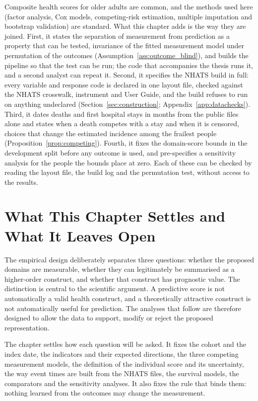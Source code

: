 Composite health scores for older adults are common, and the methods used here (factor analysis, Cox models, competing-risk estimation, multiple imputation and bootstrap validation) are standard. What this chapter adds is the way they are joined. First, it states the separation of measurement from prediction as a property that can be tested, invariance of the fitted measurement model under permutation of the outcomes (Assumption~\ref{ass:outcome_blind}), and builds the pipeline so that the test can be run; the code that accompanies the thesis runs it, and a second analyst can repeat it. Second, it specifies the NHATS build in full: every variable and response code is declared in one layout file, checked against the NHATS crosswalk, instrument and User Guide, and the build refuses to run on anything undeclared (Section~\ref{sec:construction}; Appendix~\ref{app:datachecks}). Third, it dates deaths and first hospital stays in months from the public files alone and states when a death competes with a stay and when it is censored, choices that change the estimated incidence among the frailest people (Proposition~\ref{prop:competing}). Fourth, it fixes the domain-score bounds in the development split before any outcome is used, and pre-specifies a sensitivity analysis for the people the bounds place at zero. Each of these can be checked by reading the layout file, the build log and the permutation test, without access to the results.

\section{What This Chapter Settles and What It Leaves Open}
\label{sec:methods-close}

The empirical design deliberately separates three questions: whether the proposed domains are measurable, whether they can legitimately be summarised as a higher-order construct, and whether that construct has prognostic value. The distinction is central to the scientific argument. A predictive score is not automatically a valid health construct, and a theoretically attractive construct is not automatically useful for prediction. The analyses that follow are therefore designed to allow the data to support, modify or reject the proposed representation.

The chapter settles how each question will be asked. It fixes the cohort and the index date, the indicators and their expected directions, the three competing measurement models, the definition of the individual score and its uncertainty, the way event times are built from the NHATS files, the survival models, the comparators and the sensitivity analyses. It also fixes the rule that binds them: nothing learned from the outcomes may change the measurement.

